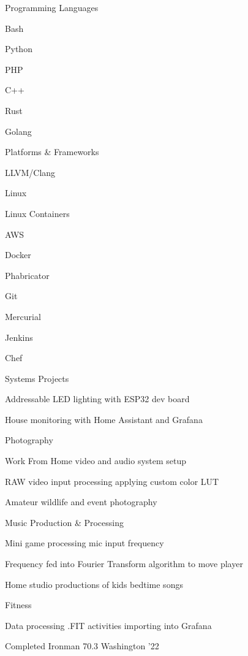 \begin{cventries}
    \cvskill
    {Programming Languages}
    {
		\begin{cvitems}
			\item Bash
			\item Python
			\item PHP
			\item C++
			\item Rust
			\item Golang
		\end{cvitems}
	}
\end{cventries}
\begin{cventries}
    \cvskill
    {Platforms \& Frameworks}
    {
		\begin{cvitems}
			\item LLVM/Clang
			\item Linux
			\item Linux Containers
			\item AWS
			\item Docker
			\item Phabricator
			\item Git
			\item Mercurial
			\item Jenkins
			\item Chef
		\end{cvitems}
	}
\end{cventries}
\begin{cventries}
	\cvskill
	{Systems Projects}
	{
		\begin{cvitems}
			\item Addressable LED lighting with ESP32 dev board
			\item House monitoring with Home Assistant and Grafana
		\end{cvitems}
	}
	\cvskill
	{Photography}
	{
		\begin{cvitems}
			\item Work From Home video and audio system setup
			\item RAW video input processing applying custom color LUT
			\item Amateur wildlife and event photography
		\end{cvitems}
	}
	\cvskill
	{Music Production \& Processing}
	{
		\begin{cvitems}
			\item Mini game processing mic input frequency
			\item Frequency fed into Fourier Transform algorithm to move player
			\item Home studio productions of kids bedtime songs
		\end{cvitems}
	}
	\cvskill
	{Fitness}
	{
		\begin{cvitems}
			\item Data processing .FIT activities importing into Grafana 
			\item Completed Ironman 70.3 Washington '22
		\end{cvitems}
	}
\end{cventries}
